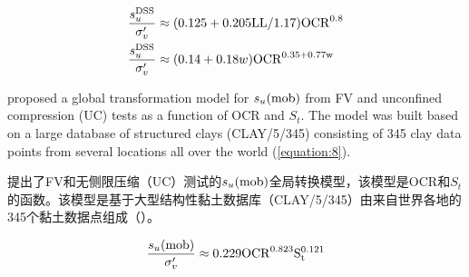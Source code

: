 \begin{align}
    \dfrac{s_u^{\rm{DSS}}}{\sigma_v'}&\approx{}(0.125+0.205\rm{LL}/1.17)\rm{OCR}^{0.8}
    \label{equation:6}\\
    \dfrac{s_u^{\rm{DSS}}}{\sigma_v'}&\approx{}(0.14+0.18w)\rm{OCR}^{0.35+0.77w}
    \label{equation:7}
\end{align}

\begin{paracol}{2}

    \citet{Ching2012522} proposed a global transformation model for $s_u(\rm{mob})$ from FV and unconfined compression (UC) tests as a function of OCR and $S_t$. The model was built based on a large database of structured clays (CLAY/5/345) consisting of 345 clay data points from several locations all over the world (\autoref{equation:8}).

    \switchcolumn

    \citet{Ching2012522}提出了FV和无侧限压缩（UC）测试的$s_u(\rm{mob})$全局转换模型，该模型是OCR和$S_t$的函数。该模型是基于大型结构性黏土数据库（CLAY/5/345）由来自世界各地的345个黏土数据点组成（）。

\end{paracol}

\begin{align}
    \dfrac{s_u(\rm{mob})}{\sigma_v'}\approx{}0.229\rm{OCR}^{0.823}S_t^{0.121}
    \label{equation:8}
\end{align}